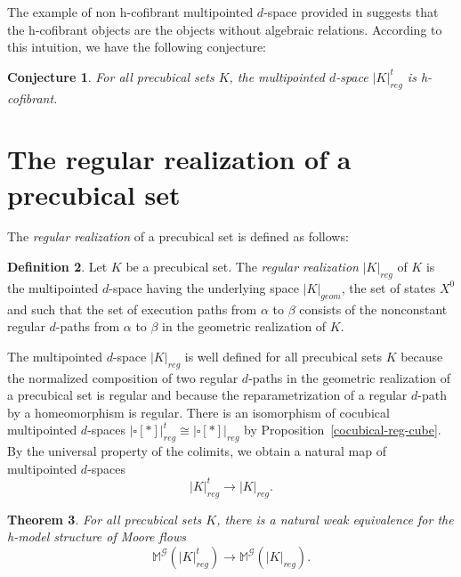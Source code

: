 \documentclass[a4paper,12pt]{amsart}
\newtheorem{thm}{Theorem}[section]
\newtheorem{conj}[thm]{Conjecture}
\newcommand{\bth}{\begin{thm}}
\renewcommand{\eth}{\end{thm}}
\theoremstyle{definition}
\newtheorem{defn}[thm]{Definition}
\newcommand{\bd}{\begin{defn}}
\newcommand{\ed}{\end{defn}}
\newcommand{\iso}{\cong}
\newcommand{\moore}{{\mathbb{M}}}
\begin{document}
The example of non h-cofibrant multipointed $d$-space provided in \cite[Proposition~6.19]{QHMmodel} suggests that the h-cofibrant objects are the objects without algebraic relations. According to this intuition, we have the following conjecture:

\begin{conj}
	For all precubical sets $K$, the multipointed $d$-space $|K|^t_{reg}$ is h-cofibrant. 
\end{conj}


\section{The regular realization of a precubical set}
\label{question-r}

The \textit{regular realization} of a precubical set is defined as follows: 

\bd \label{reg_rea}
Let $K$ be a precubical set. The \textit{regular realization} $|K|_{reg}$ of $K$ is the multipointed $d$-space having  the underlying space $|K|_{geom}$, the set of states $X^0$ and such that the set of execution paths from $\alpha$ to $\beta$ consists of the nonconstant regular $d$-paths from $\alpha$ to $\beta$ in the geometric realization of $K$.
\ed

The multipointed $d$-space $|K|_{reg}$ is well defined for all precubical sets $K$ because the normalized composition of two regular $d$-paths in the geometric realization of a precubical set is regular and because the reparametrization of a regular $d$-path by a homeomorphism is regular. There is an isomorphism of cocubical multipointed $d$-spaces $|\square[*]|^t_{reg}\iso |\square[*]|_{reg}$ by Proposition~\ref{cocubical-reg-cube}. By the universal property of the colimits, we obtain a natural map of multipointed $d$-spaces \[|K|^t_{reg}\longrightarrow |K|_{reg}.\] 

\bth \label{comparison-tame-nottame-Moore-flow}
For all precubical sets $K$, there is a natural weak equivalence for the h-model structure of Moore flows 
\[
\moore^{\mathcal{G}}(|K|^t_{reg}) \longrightarrow \moore^{\mathcal{G}}(|K|_{reg}).
\]
\eth
\end{document}
